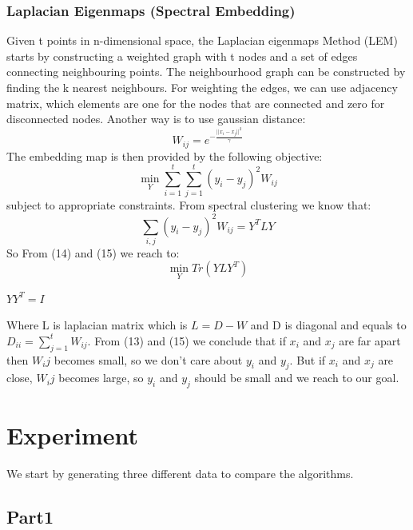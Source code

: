 \documentclass[a4paper]{article}
\begin{document}
\subsubsection{Laplacian Eigenmaps (Spectral Embedding)}
Given t points in n-dimensional space, the Laplacian eigenmaps Method (LEM)  starts by constructing a weighted graph with t nodes and a set of
edges connecting neighbouring points. The neighbourhood graph can be
constructed by finding the k nearest neighbours. For weighting the edges, we can use adjacency matrix, which elements are one for the nodes that are connected and zero for disconnected nodes. Another way is to use gaussian distance:
\begin{equation}
W_{ij} = e{^{-\frac{||x_i - x_j|| ^ 2}{\gamma}}}
\end{equation}
The embedding map is then provided by the following objective:
\begin{equation}
\min_{Y} \sum_{i = 1}^{t} \sum_{j = 1}^{t} (y_i - y_j)^2 W_{ij}
\end{equation}
subject to appropriate constraints. From spectral clustering we know that:
\begin{equation}
\sum_{i,j} (y_i - y_j)^2 W_{ij} = Y^T L Y 
\end{equation}
So From (14) and (15) we reach to:
\begin{equation}
\min_{Y} Tr(YLY^T)  
\end{equation}
\begin{center}
  $YY^T = I$\\
\end{center}
Where L is laplacian matrix which is $L = D - W$ and D is diagonal and equals to $D_{ii} = \sum_{j=1}^{t} W_{ij}$. From (13) and (15) we conclude that if $x_i$ and $x_j$ are far apart then $W_ij$ becomes small, so we don't care about $y_i$ and $y_j$. But if $x_i$ and $x_j$ are close, $W_ij$ becomes large, so $y_i$ and $y_j$ should be small and we reach to our goal.

\section{Experiment}
We start by generating three different data to compare the algorithms.
\subsection{Part1}
\end{document}
